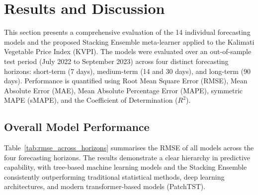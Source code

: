\section{Results and Discussion}
\label{sec:results}

This section presents a comprehensive evaluation of the 14 individual forecasting models and the proposed Stacking Ensemble meta-learner applied to the Kalimati Vegetable Price Index (KVPI). The models were evaluated over an out-of-sample test period (July 2022 to September 2023) across four distinct forecasting horizons: short-term (7 days), medium-term (14 and 30 days), and long-term (90 days). Performance is quantified using Root Mean Square Error (RMSE), Mean Absolute Error (MAE), Mean Absolute Percentage Error (MAPE), symmetric MAPE (sMAPE), and the Coefficient of Determination ($R^2$).

\subsection{Overall Model Performance}

Table~\ref{tab:rmse_across_horizons} summarises the RMSE of all models across the four forecasting horizons. The results demonstrate a clear hierarchy in predictive capability, with tree-based machine learning models and the Stacking Ensemble consistently outperforming traditional statistical methods, deep learning architectures, and modern transformer-based models (PatchTST).

